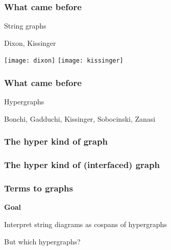 \begin{frame}
    \frametitle{What came before}

    \pause
    \centering
    \LARGE
    String graphs

    \pause
    \normalsize
    \vspace{1em}
    Dixon, Kissinger

    \texttt{[image: dixon]}
    \texttt{[image: kissinger]}

\end{frame}

\begin{frame}
    \frametitle{What came before}

    \pause
    \centering
    \LARGE
    Hypergraphs
    \quad

    \pause
    \normalsize
    \vspace{1em}
    Bonchi, Gadduchi, Kissinger, Sobocinski, Zanasi

    \hypergraphpeople

\end{frame}

\begin{frame}
    \frametitle{The hyper kind of graph}

    \centering

\end{frame}

\begin{frame}
    \frametitle{The hyper kind of (interfaced) graph}

    \centering

\end{frame}

\begin{frame}
    \frametitle{Terms to graphs}

    \centering
    \LARGE

    \textbf{Goal}

    Interpret \alert{string diagrams} as \alert{cospans of hypergraphs}

    \vspace{1em}
    \pause

    But which hypergraphs?

\end{frame}

